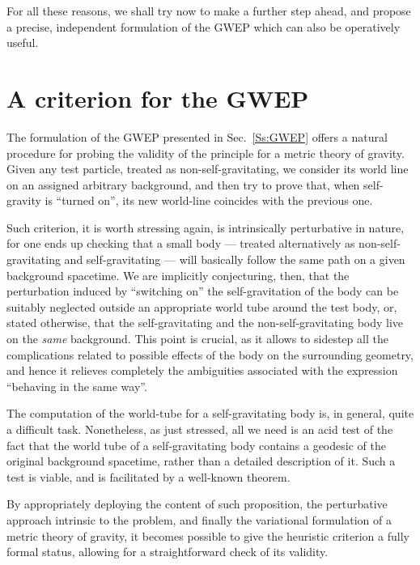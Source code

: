 \documentclass[a4paper,showkeys,aps,prd,reprint,nofootinbib,showpacs,twocolumn]{revtex4-1}
\theoremstyle{plain}
\begin{document}
For all these reasons, we shall try now to make a further step ahead, and propose a precise, independent formulation of the GWEP which can also be operatively useful.

\section{A criterion for the GWEP}
\label{S:5}

The formulation of the GWEP presented in Sec.~\ref{Ss:GWEP} offers a natural procedure for probing the validity of the principle for a metric theory of gravity.  Given any test particle, treated as non-self-gravitating, we consider its world line on an assigned arbitrary background, and then try to prove that, when self-gravity is ``turned on'', its new world-line coincides with the previous one. 

Such criterion, it is worth stressing again, is intrinsically perturbative in nature, for one ends up checking that a small body --- treated alternatively as non-self-gravitating and self-gravitating --- will basically follow the same path on a given background spacetime.  We are implicitly conjecturing, then, that the perturbation induced by ``switching on'' the self-gravitation of the body can be suitably neglected outside an appropriate world tube around the test body, or, stated otherwise, that the self-gravitating and the non-self-gravitating body live on the \emph{same} background.  This point is crucial, as it allows to sidestep all the complications related to possible effects of the body on the surrounding geometry, and hence it relieves completely the ambiguities associated with the expression ``behaving in the same way''.

The computation of the world-tube for a self-gravitating body is, in general, quite a difficult task. Nonetheless, as just stressed, all we need is an acid test of the fact that the world tube of a self-gravitating body contains a geodesic of the original background spacetime, rather than a detailed description of it.  Such a test is viable, and is facilitated by a well-known theorem.

By appropriately deploying the content of such proposition, the perturbative approach intrinsic to the problem, and finally the variational formulation of a metric theory of gravity, it becomes possible to give the heuristic criterion a fully formal status, allowing for a straightforward check of its validity.
\end{document}
